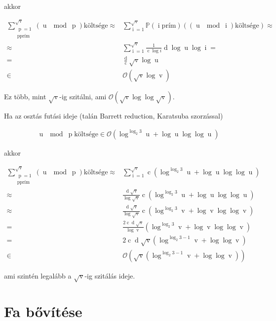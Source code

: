 \documentclass{article}
\newcommand*{\bigOrdo}{\ensuremath{\mathcal{O}}}
\newcommand*{\vC}{\ensuremath{\operatorname{c}}}
\newcommand*{\vD}{\ensuremath{\operatorname{d}}}
\newcommand*{\vI}{\ensuremath{\operatorname{i}}}
\newcommand*{\vP}{\ensuremath{\operatorname{p}}}
\newcommand*{\vU}{\ensuremath{\operatorname{u}}}
\newcommand*{\vV}{\ensuremath{\operatorname{v}}}
\begin{document}
akkor

\begin{align*}
\sum_{\substack{\vP=1 \\ \vP \text{prím}}}^{\sqrt{\vV}}
	(\vU \mod \vP) \text{költsége}
	\approx &
	\sum_{\vI=1}^{\sqrt{\vV}}
	\mathbb{P}(\vI \text{prím}) ((\vU \mod \vI) \text{költsége}) \approx \\
\approx& \sum_{\vI=1}^{\sqrt{\vV}}
	\frac{1}{\vC \log{i}} \vD \log{\vU} \log{\vI} = \\
=& \frac{\vD}{\vC} \sqrt{\vV} \log{\vU} \\
\in & \bigOrdo(\sqrt{\vV}\log{\vV})
\end{align*}

Ez több, mint $\sqrt{\vV}$-ig szitálni, ami $\bigOrdo(\sqrt{\vV}\log{\log{\sqrt{\vV}}})$.

Ha az osztás futási ideje (talán Barrett reduction, Karatsuba szorzással)

\begin{align*}
\vU \mod \vP \text{költsége} \in
	\bigOrdo\left(\log^{\log_2{3}}{\vU} + \log{\vU} \log{\log{\vU}} \right)
\end{align*}

akkor

\begin{align*}
\sum_{\substack{\vP=1 \\ \vP \text{prím}}}^{\sqrt{\vV}}
	(\vU \mod \vP) \text{költsége}
	\approx &
	\sum_{\vI=1}^{\sqrt{\vV}}
	\vC \left(\log^{\log_2{3}}{\vU} + \log{\vU} \log{\log{\vU}} \right) \\
	\approx & \frac{\vD\sqrt{\vV}}{\log{\sqrt{\vV}}} \vC \left(\log^{\log_2{3}}{\vU} + \log{\vU} \log{\log{\vU}} \right) \\
	\approx & \frac{\vD\sqrt{\vV}}{\log{\sqrt{\vV}}} \vC \left(\log^{\log_2{3}}{\vV} + \log{\vV} \log{\log{\vV}} \right) \\
	= & \frac{2\vC\vD\sqrt{\vV}}{\log{\vV}} \left(\log^{\log_2{3}}{\vV} + \log{\vV} \log{\log{\vV}} \right) \\
	= & 2\vC\vD\sqrt{\vV} \left(\log^{\log_2{3}-1}{\vV} + \log{\log{\vV}} \right) \\
	\in & \bigOrdo \left( \sqrt{\vV} \left(\log^{\log_2{3}-1}{\vV} + \log{\log{\vV}} \right) \right)
\end{align*}

ami szintén legalább a $\sqrt{\vV}$-ig szitálás ideje.

\section{Fa bővítése}
\end{document}
